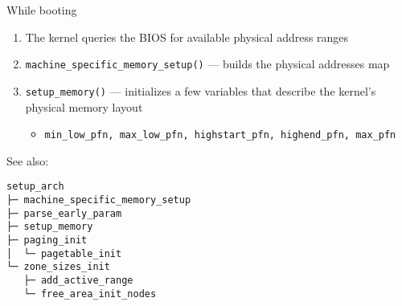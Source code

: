 \begin{frame}%
  \begin{block}{While booting}
    \begin{enumerate}
    \item The kernel queries the BIOS for available physical address ranges
    \item \texttt{machine\_specific\_memory\_setup()} --- builds the physical addresses map
    \item \texttt{setup\_memory()} --- initializes a few variables that describe the
      kernel's physical memory layout
      \begin{itemize}
      \item \texttt{min\_low\_pfn, max\_low\_pfn, highstart\_pfn, highend\_pfn, max\_pfn}
      \end{itemize}
    \end{enumerate}
  \end{block}
\end{frame}

See also: 

\verbatimfont{\dejavu}
\begin{verbatim}
setup_arch
├─ machine_specific_memory_setup
├─ parse_early_param
├─ setup_memory
├─ paging_init
│  └─ pagetable_init
└─ zone_sizes_init
   ├─ add_active_range
   └─ free_area_init_nodes
\end{verbatim}

